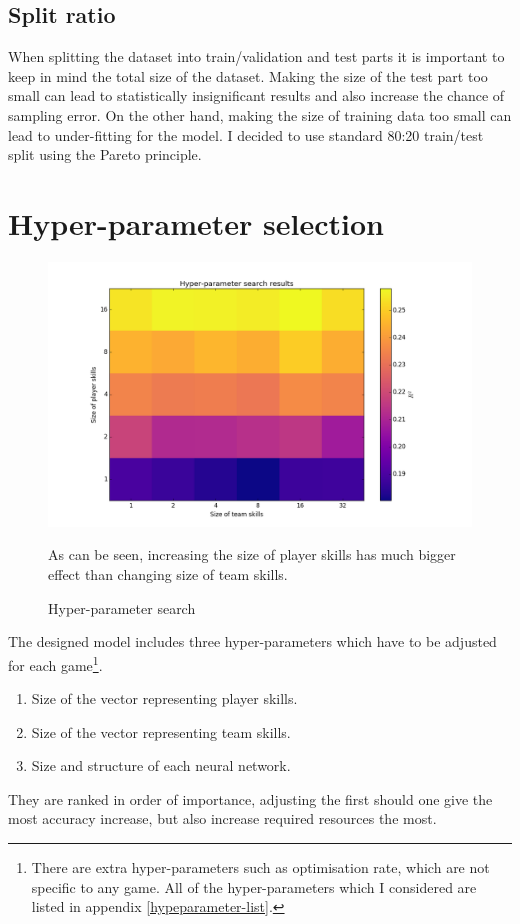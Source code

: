 \documentclass[12pt,a4paper]{book}
\newcommand\note[1]{\vspace*{-0.5\baselineskip}\caption*{#1}}
\begin{document}
\subsection{Split ratio}
When splitting the dataset into train/validation and test parts it is important to keep in mind the total size of the dataset.
Making the size of the test part too small can lead to statistically insignificant results and also increase the chance of sampling error.
On the other hand, making the size of training data too small can lead to under-fitting for the model.
I decided to use standard 80:20 train/test split using the Pareto principle.

\section{Hyper-parameter selection}
\begin{figure}[ht]
\centering
\includegraphics[scale=0.5]{hyper-parameter-search}
\caption{Hyper-parameter search}
\note{As can be seen, increasing the size of player skills has much bigger effect than changing size of team skills.}
\label{fig:hyper-parameter-search}
\end{figure}
The designed model includes three hyper-parameters which have to be adjusted for each game\footnote{There are extra hyper-parameters such as optimisation rate, which are not specific to any game. 
All of the hyper-parameters which I considered are listed in appendix  \ref{hypeparameter-list}.}.
\begin{enumerate}
\item Size of the vector representing player skills.
\item Size of the vector representing team skills.
\item Size and structure of each neural network.
\end{enumerate}
They are ranked in order of importance, adjusting the first should one give the most accuracy increase, but also increase required resources the most.
\end{document}
